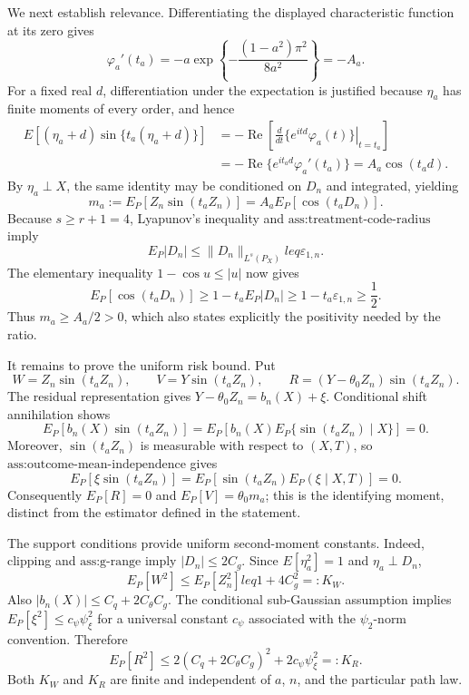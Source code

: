 We next establish relevance.  Differentiating the displayed characteristic function at its zero gives
\[
 \varphi_a'(t_a)
 =-a\exp\!\left\{-\frac{(1-a^2)\pi^2}{8a^2}\right\}
 =-A_a.
\]
For a fixed real \(d\), differentiation under the expectation is justified because \(\eta_a\) has finite moments of every order, and hence
\[
\begin{aligned}
 E[(\eta_a+d)\sin\{t_a(\eta_a+d)\}]
 &=-\operatorname{Re}\left[
   \left.\frac{d}{dt}\{e^{itd}\varphi_a(t)\}\right|_{t=t_a}
 \right]\\
 &=-\operatorname{Re}\{e^{it_ad}\varphi_a'(t_a)\}
 =A_a\cos(t_ad).
\end{aligned}
\]
By \(\eta_a\perp X\), the same identity may be conditioned on \(D_n\) and integrated, yielding
\[
 m_a:=E_P[Z_n\sin(t_aZ_n)]
 =A_aE_P[\cos(t_aD_n)].
\]
Because \(s\geq r+1=4\), Lyapunov's inequality and \(\text{ass:treatment-code-radius}\) imply
\[
 E_P|D_n|\leq\|D_n\|_{L^s(P_X)}leq\varepsilon_{1,n}.
\]
The elementary inequality \(1-\cos u\leq |u|\) now gives
\[
 E_P[\cos(t_aD_n)]
 \geq1-t_aE_P|D_n|
 \geq1-t_a\varepsilon_{1,n}
 \geq\frac12.
\]
Thus \(m_a\geq A_a/2>0\), which also states explicitly the positivity needed by the ratio.

It remains to prove the uniform risk bound.  Put
\[
 W=Z_n\sin(t_aZ_n),
 \qquad
 V=Y\sin(t_aZ_n),
 \qquad
 R=(Y-\theta_0Z_n)\sin(t_aZ_n).
\]
The residual representation gives \(Y-\theta_0Z_n=b_n(X)+\xi\).  Conditional shift annihilation shows
\[
 E_P[b_n(X)\sin(t_aZ_n)]
 =E_P\!\left[b_n(X)E_P\{\sin(t_aZ_n)\mid X\}\right]=0.
\]
Moreover, \(\sin(t_aZ_n)\) is measurable with respect to \((X,T)\), so \(\text{ass:outcome-mean-independence}\) gives
\[
 E_P[\xi\sin(t_aZ_n)]
 =E_P\!\left[\sin(t_aZ_n)E_P(\xi\mid X,T)\right]=0.
\]
Consequently \(E_P[R]=0\) and \(E_P[V]=\theta_0m_a\); this is the identifying moment, distinct from the estimator defined in the statement.

The support conditions provide uniform second-moment constants.  Indeed, clipping and \(\text{ass:g-range}\) imply \(|D_n|\leq2C_g\).  Since \(E[\eta_a^2]=1\) and \(\eta_a\perp D_n\),
\[
 E_P[W^2]\leq E_P[Z_n^2]leq 1+4C_g^2=:K_W.
\]
Also \(|b_n(X)|\leq C_q+2C_{\theta}C_g\).  The conditional sub-Gaussian assumption implies \(E_P[\xi^2]\leq c_{\psi}\psi_{\xi}^2\) for a universal constant \(c_{\psi}\) associated with the \(\psi_2\)-norm convention.  Therefore
\[
 E_P[R^2]
 \leq 2(C_q+2C_{\theta}C_g)^2+2c_{\psi}\psi_{\xi}^2
 =:K_R.
\]
Both \(K_W\) and \(K_R\) are finite and independent of \(a\), \(n\), and the particular path law.

